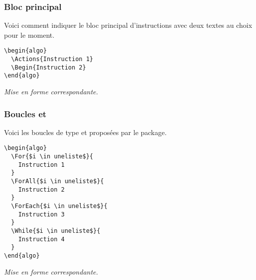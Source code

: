 \documentclass[12pt,a4paper]{article}
\theoremstyle{definition}
\newenvironment{frame-gene}[1][]{
	\begin{tcolorbox}[
		title        = #1, 
		colbacktitle = black!10!white, 
		colback      = white, 
		coltitle     = black,
		fonttitle    = \bfseries\itshape\small, 
		breakable,
		center title]
}{
	\end{tcolorbox}
}
\begin{document}
\subsubsection{Bloc principal}

Voici comment indiquer le bloc principal d'instructions avec deux textes au choix pour le moment.


\begin{multicols}{2}
    \centering
    \begin{frame-gene}
\begin{verbatim}
\begin{algo}
  \Actions{Instruction 1}
  \Begin{Instruction 2}
\end{algo}
\end{verbatim}
    \end{frame-gene}
    \vfill\null
    \columnbreak
    \textit{Mise en forme correspondante.}
\begin{algo}
\end{algo}
    \vfill\null
\end{multicols}


\subsubsection{Boucles \TTfor{} et \TTwhile{}}

Voici les boucles de type \TTfor{} et \TTwhile{} proposées par le package.

\newpage


\begin{multicols}{2}
    \centering
    \begin{frame-gene}
\begin{verbatim}
\begin{algo}
  \For{$i \in uneliste$}{
    Instruction 1
  }
  \ForAll{$i \in uneliste$}{
    Instruction 2
  }
  \ForEach{$i \in uneliste$}{
    Instruction 3
  }
  \While{$i \in uneliste$}{
    Instruction 4
  }
\end{algo}
\end{verbatim}
    \end{frame-gene}
    \vfill\null
    \columnbreak
    \textit{Mise en forme correspondante.}
\begin{algo}
\end{algo}
    \vfill\null
\end{multicols}
\end{document}
